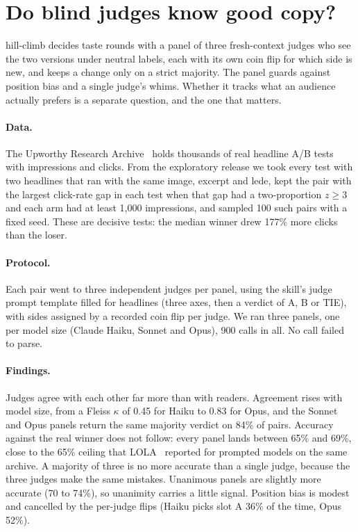 \section{Do blind judges know good copy?}
\label{sec:taste}

hill-climb decides taste rounds with a panel of three fresh-context judges who see the two versions under
neutral labels, each with its own coin flip for which side is new, and keeps a change only on a strict
majority. The panel guards against position bias and a single judge's whims. Whether it tracks what an audience
actually prefers is a separate question, and the one that matters.

\paragraph{Data.} The Upworthy Research Archive~\cite{upworthy} holds thousands of real headline A/B tests with
impressions and clicks. From the exploratory release we took every test with two headlines that ran with the
same image, excerpt and lede, kept the pair with the largest click-rate gap in each test when that gap had a
two-proportion $z \ge 3$ and each arm had at least 1{,}000 impressions, and sampled 100 such pairs with a fixed
seed. These are decisive tests: the median winner drew 177\% more clicks than the loser.

\paragraph{Protocol.} Each pair went to three independent judges per panel, using the skill's judge prompt
template filled for headlines (three axes, then a verdict of A, B or TIE), with sides assigned by a recorded
coin flip per judge. We ran three panels, one per model size (Claude Haiku, Sonnet and Opus), 900 calls in all.
No call failed to parse.



\paragraph{Findings.} Judges agree with each other far more than with readers. Agreement rises with model size,
from a Fleiss $\kappa$ of 0.45 for Haiku to 0.83 for Opus, and the Sonnet and Opus panels return the same majority
verdict on 84\% of pairs. Accuracy against the real winner does not follow: every panel lands between 65\% and
69\%, close to the 65\% ceiling that LOLA~\cite{lola} reported for prompted models on the same archive. A majority of
three is no more accurate than a single judge, because the three judges make the same mistakes. Unanimous
panels are slightly more accurate (70 to 74\%), so unanimity carries a little signal. Position bias is
modest and cancelled by the per-judge flips (Haiku picks slot A 36\% of the time, Opus 52\%).

